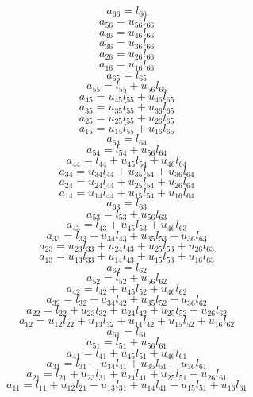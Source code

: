 \documentclass[10pt,a4paper,dvipdfmx]{article}
\begin{document}
\begin{multicols}{2}
$$ a_{{6}{6}} = l_{{6}{6}} $$
$$ a_{{5}{6}} = u_{{5}{6}} l_{{6}{6}} $$
$$ a_{{4}{6}} = u_{{4}{6}} l_{{6}{6}} $$
$$ a_{{3}{6}} = u_{{3}{6}} l_{{6}{6}} $$
$$ a_{{2}{6}} = u_{{2}{6}} l_{{6}{6}} $$
$$ a_{{1}{6}} = u_{{1}{6}} l_{{6}{6}} $$
$$ a_{{6}{5}} = l_{{6}{5}} $$
$$ a_{{5}{5}} = l_{{5}{5}} + u_{{5}{6}} l_{{6}{5}} $$
$$ a_{{4}{5}} = u_{{4}{5}} l_{{5}{5}} + u_{{4}{6}} l_{{6}{5}} $$
$$ a_{{3}{5}} = u_{{3}{5}} l_{{5}{5}} + u_{{3}{6}} l_{{6}{5}} $$
$$ a_{{2}{5}} = u_{{2}{5}} l_{{5}{5}} + u_{{2}{6}} l_{{6}{5}} $$
$$ a_{{1}{5}} = u_{{1}{5}} l_{{5}{5}} + u_{{1}{6}} l_{{6}{5}} $$
$$ a_{{6}{4}} = l_{{6}{4}} $$
$$ a_{{5}{4}} = l_{{5}{4}} + u_{{5}{6}} l_{{6}{4}} $$
$$ a_{{4}{4}} = l_{{4}{4}} + u_{{4}{5}} l_{{5}{4}} + u_{{4}{6}} l_{{6}{4}} $$
$$ a_{{3}{4}} = u_{{3}{4}} l_{{4}{4}} + u_{{3}{5}} l_{{5}{4}} + u_{{3}{6}} l_{{6}{4}} $$
$$ a_{{2}{4}} = u_{{2}{4}} l_{{4}{4}} + u_{{2}{5}} l_{{5}{4}} + u_{{2}{6}} l_{{6}{4}} $$
$$ a_{{1}{4}} = u_{{1}{4}} l_{{4}{4}} + u_{{1}{5}} l_{{5}{4}} + u_{{1}{6}} l_{{6}{4}} $$
$$ a_{{6}{3}} = l_{{6}{3}} $$
$$ a_{{5}{3}} = l_{{5}{3}} + u_{{5}{6}} l_{{6}{3}} $$
$$ a_{{4}{3}} = l_{{4}{3}} + u_{{4}{5}} l_{{5}{3}} + u_{{4}{6}} l_{{6}{3}} $$
$$ a_{{3}{3}} = l_{{3}{3}} + u_{{3}{4}} l_{{4}{3}} + u_{{3}{5}} l_{{5}{3}} + u_{{3}{6}} l_{{6}{3}} $$
$$ a_{{2}{3}} = u_{{2}{3}} l_{{3}{3}} + u_{{2}{4}} l_{{4}{3}} + u_{{2}{5}} l_{{5}{3}} + u_{{2}{6}} l_{{6}{3}} $$
$$ a_{{1}{3}} = u_{{1}{3}} l_{{3}{3}} + u_{{1}{4}} l_{{4}{3}} + u_{{1}{5}} l_{{5}{3}} + u_{{1}{6}} l_{{6}{3}} $$
$$ a_{{6}{2}} = l_{{6}{2}} $$
$$ a_{{5}{2}} = l_{{5}{2}} + u_{{5}{6}} l_{{6}{2}} $$
$$ a_{{4}{2}} = l_{{4}{2}} + u_{{4}{5}} l_{{5}{2}} + u_{{4}{6}} l_{{6}{2}} $$
$$ a_{{3}{2}} = l_{{3}{2}} + u_{{3}{4}} l_{{4}{2}} + u_{{3}{5}} l_{{5}{2}} + u_{{3}{6}} l_{{6}{2}} $$
$$ a_{{2}{2}} = l_{{2}{2}} + u_{{2}{3}} l_{{3}{2}} + u_{{2}{4}} l_{{4}{2}} + u_{{2}{5}} l_{{5}{2}} + u_{{2}{6}} l_{{6}{2}} $$
$$ a_{{1}{2}} = u_{{1}{2}} l_{{2}{2}} + u_{{1}{3}} l_{{3}{2}} + u_{{1}{4}} l_{{4}{2}} + u_{{1}{5}} l_{{5}{2}} + u_{{1}{6}} l_{{6}{2}} $$
$$ a_{{6}{1}} = l_{{6}{1}} $$
$$ a_{{5}{1}} = l_{{5}{1}} + u_{{5}{6}} l_{{6}{1}} $$
$$ a_{{4}{1}} = l_{{4}{1}} + u_{{4}{5}} l_{{5}{1}} + u_{{4}{6}} l_{{6}{1}} $$
$$ a_{{3}{1}} = l_{{3}{1}} + u_{{3}{4}} l_{{4}{1}} + u_{{3}{5}} l_{{5}{1}} + u_{{3}{6}} l_{{6}{1}} $$
$$ a_{{2}{1}} = l_{{2}{1}} + u_{{2}{3}} l_{{3}{1}} + u_{{2}{4}} l_{{4}{1}} + u_{{2}{5}} l_{{5}{1}} + u_{{2}{6}} l_{{6}{1}} $$
$$ a_{{1}{1}} = l_{{1}{1}} + u_{{1}{2}} l_{{2}{1}} + u_{{1}{3}} l_{{3}{1}} + u_{{1}{4}} l_{{4}{1}} + u_{{1}{5}} l_{{5}{1}} + u_{{1}{6}} l_{{6}{1}} $$

\end{multicols}
\end{document}
